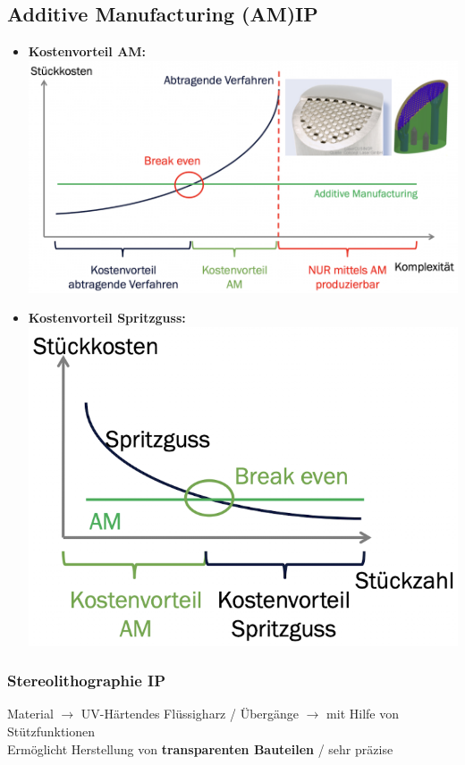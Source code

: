 \subsection{Additive Manufacturing (AM)\hfill IP}
    \begin{footnotesize}
        \begin{itemize}
            \item \textbf{Kostenvorteil AM:}
            \\\includegraphics[width = 0.8\linewidth]{src/images/MAEIP_AM}

            \item \textbf{Kostenvorteil Spritzguss:}
            \\\includegraphics[width = 0.5\linewidth]{src/images/MAEIP_KostenvorteilSpritzguss}
        \end{itemize}
    \end{footnotesize}

    \subsubsection{Stereolithographie \hfill IP}
    \begin{scriptsize}
        Material $\to$ UV-Härtendes Flüssigharz / Übergänge $\to$ mit Hilfe von Stützfunktionen
        \\Ermöglicht Herstellung von \textbf{transparenten Bauteilen} / sehr präzise
    \end{scriptsize}

